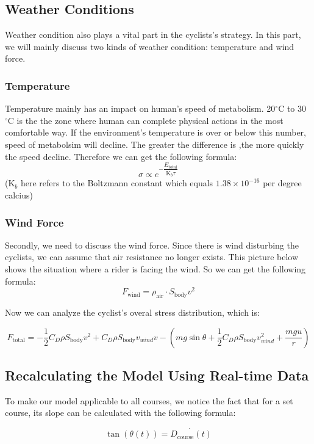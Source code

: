 \documentclass{article}
\begin{document}
		\subsection{Weather Conditions}
			Weather condition also plays a vital part in the cyclists's strategy. In this part, we will mainly discuss two kinds of weather condition: temperature and wind force.
		\subsubsection{Temperature}
			Temperature mainly has an impact on human's speed of metabolism. 20$^\circ \mathrm{C}$ to 30$^\circ\mathrm{C}$ is the the zone where human can complete physical actions in the most comfortable way. If the environment's temperature is over or below this number, speed of metabolsim will decline. The greater the difference is ,the more quickly the speed decline. Therefore we can get the following formula:
			$$\sigma\propto e^{-\dfrac{ E _\mathrm{total}}{\mathrm{K}_ b \tau}}$$
			($\mathrm{K}_ b $ here refers to the Boltzmann constant which equals $1.38\times10^{-16}$ per degree calcius)
		\subsubsection{Wind Force}
			Secondly, we need to discuss the wind force. Since there is wind disturbing the cyclists, we can assume that air resistance no longer exists. This picture below shows the situation where a rider is facing the wind. So we can get the following formula:
			$$F_\mathrm{wind}=\rho_\mathrm{air}\cdot S_\mathrm{body}v^2$$

			Now we can analyze the cyclist's overal stress distribution, which is:

			\[F_\mathrm{total}=-\dfrac{1}{2}C_ D \rho S_\mathrm{body} v^2+C_ D \rho S_\mathrm{body}v_{wind}v-(mg\sin\theta+\dfrac{1}{2}C_ D \rho S_\mathrm{body}v_{wind}^2+\dfrac{mgu}{r})\]



		\subsection{Recalculating the Model Using Real-time Data}

			To make our model applicable to all courses, we notice the fact that for a set course, its slope can be calculated with the following formula:

			\[ \tan (\theta\left(t\right)) =\dot{D_{\mathrm{course}}\left( t \right) } \]
\end{document}

